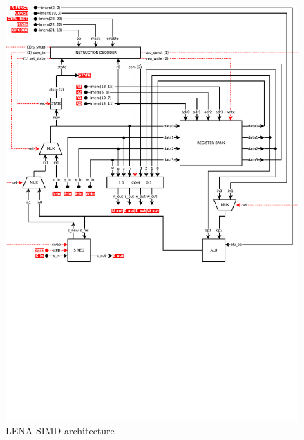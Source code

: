 \begin{figure}[h]
  \centering
  \includegraphics[width=\linewidth,clip,trim=0 11cm 0 0]
                  {fig/fpga/fpga-simd-arch.pdf}
  \caption{LENA SIMD architecture}
  \label{fig:fpga-simd-arch}
\end{figure}
